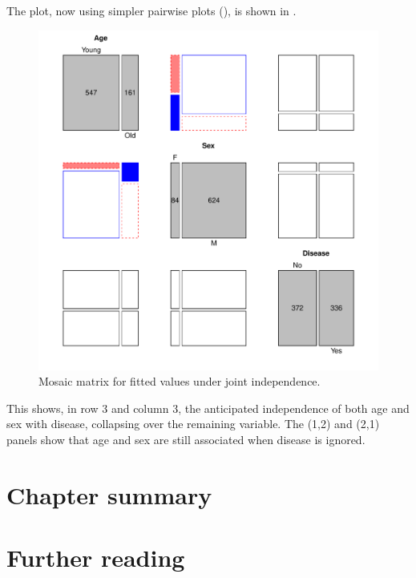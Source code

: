 \documentclass[11pt]{book}
\renewenvironment{knitrout}{\small\renewcommand{\baselinestretch}{.85}}{} %
\begin{document}
The  plot, now using simpler pairwise plots (),
is shown in .
\begin{knitrout}
\color{fgcolor}\begin{kframe}
\begin{alltt}
 
\end{alltt}
\end{kframe}\begin{figure}[!htb]


\centerline{\includegraphics[width=.8\textwidth]{ch05/fig/struc-mos4} }

\caption[Mosaic matrix for fitted values under joint independence]{Mosaic matrix for fitted values under joint independence.\label{fig:struc-mos4}}
\end{figure}


\end{knitrout}
This shows, in row 3 and column 3, the anticipated independence of both age and sex with
disease, collapsing over the remaining variable.  
The (1,2) and (2,1) panels show that age and sex are still associated
when disease is ignored.

\section{Chapter summary}\label{sec:mosaic-summary}


\section{Further reading}\label{sec:mosaic-reading}
\end{document}
